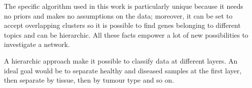 The specific algorithm used in this work is particularly unique because
it needs no priors and makes no assumptions on the data; moreover, it can
be set to accept overlapping clusters so it is possible to find genes
belonging to different topics and can be hierarchic. All these facts
empower a lot of new possibilities to investigate a network.

A hierarchic approach make it possible to classify data at different
layers. An ideal goal would be to separate healthy and diseased samples
at the first layer, then separate by tissue, then by tumour type and so
on.
